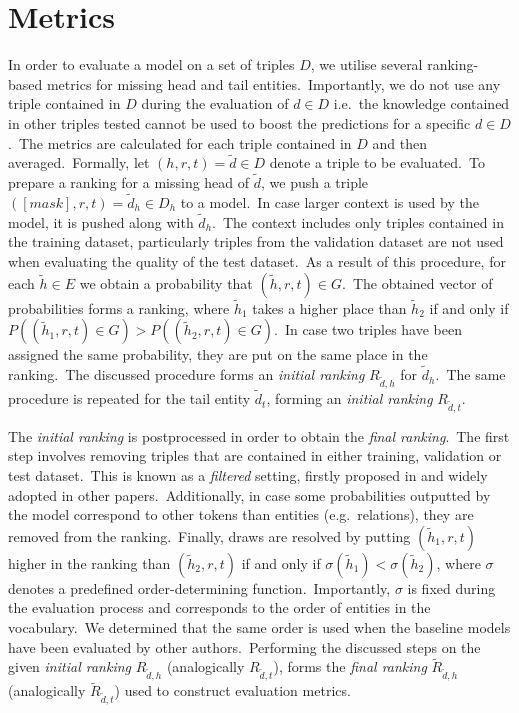 \documentclass[longabstract, english, mgr]{iithesis}
\theoremstyle{default_theorem_style}\newtheorem{theorem}{Theorem}
\theoremstyle{default_theorem_style}\newtheorem{definition}{Definition}
\begin{document}
\section{Metrics} \label{sec:metrics}

\noindent In order to evaluate a model on a set of triples $D$, we utilise several ranking-based
metrics for missing head and tail entities.\ Importantly, we do not use any triple contained in $D$ during the
evaluation of $d \in D$ i.e.\ the knowledge contained in other triples tested cannot be used to boost the predictions
for a specific $d \in D$.\ The metrics are calculated for each triple contained in $D$ and then averaged.\ Formally,
let $(h, r, t) = \tilde{d} \in D$ denote a triple to be evaluated.\ To prepare a ranking for a missing head of
$\tilde{d}$, we push a triple $([mask], r, t) = \tilde{d}_h \in D_h$ to a model.\ In case larger context is used by
the model, it is pushed along with $\tilde{d}_h$.\ The context includes only triples contained in the training
dataset, particularly triples from the validation dataset are not used when evaluating the quality of the test
dataset.\ As a result of this procedure, for each $\tilde{h} \in E$ we obtain a probability that
$(\tilde{h}, r, t) \in G$.\ The obtained vector of probabilities forms a ranking, where $\tilde{h}_1$ takes a higher
place than $\tilde{h}_2$ if and only if $P((\tilde{h}_1, r, t) \in G) > P((\tilde{h}_2, r, t) \in G)$.\ In case two
triples have been assigned the same probability, they are put on the same place in the ranking.\ The discussed procedure
forms an \textit{initial ranking} $R_{\tilde{d}, h}$ for $\tilde{d}_h$.\ The same procedure is repeated for
the tail entity $\tilde{d}_t$, forming an \textit{initial ranking} $R_{\tilde{d}, t}$.\newline

\noindent The \textit{initial ranking} is postprocessed in order to obtain the \textit{final ranking}.\ The first
step involves removing triples that are contained in either training, validation or test
dataset.\ This is known as a \textit{filtered} setting, firstly proposed in \cite{transe_model} and widely adopted in
other papers.\ Additionally, in case some probabilities outputted by the model correspond to other tokens than entities
(e.g.\ relations), they are removed from the ranking.\ Finally, draws are resolved by putting $(\tilde{h}_1, r, t)$
higher in the ranking than $(\tilde{h}_2, r, t)$ if and only if $\sigma(\tilde{h}_1) < \sigma(\tilde{h}_2)$, where
$\sigma$ denotes a predefined order-determining function.\ Importantly, $\sigma$ is fixed during the evaluation process
and corresponds to the order of entities in the vocabulary.\ We determined that the same order is used when the baseline
models have been evaluated by other authors.\ Performing the discussed steps on the given \textit{initial ranking}
$R_{\tilde{d}, h}$ (analogically $R_{\tilde{d}, t}$), forms the \textit{final ranking}
$\tilde{R}_{\tilde{d}, h}$ (analogically $\tilde{R}_{\tilde{d}, t}$) used to construct evaluation metrics.\newline
\end{document}
